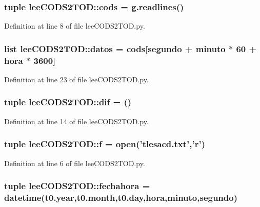\subsubsection[{cods}]{\setlength{\rightskip}{0pt plus 5cm}tuple {\bf lee\-C\-O\-D\-S2\-T\-O\-D\-::cods} = g.\-readlines()}\label{namespacelee_c_o_d_s2_t_o_d_a1091d58ce26082e7b7c4e94c12fd4dcb}


\-Definition at line 8 of file lee\-C\-O\-D\-S2\-T\-O\-D.\-py.

\subsubsection[{datos}]{\setlength{\rightskip}{0pt plus 5cm}list {\bf lee\-C\-O\-D\-S2\-T\-O\-D\-::datos} = {\bf cods}[segundo + minuto $\ast$ 60 + hora $\ast$ 3600]}\label{namespacelee_c_o_d_s2_t_o_d_a75950e762348f5e054dc20db515efd08}


\-Definition at line 23 of file lee\-C\-O\-D\-S2\-T\-O\-D.\-py.

\subsubsection[{dif}]{\setlength{\rightskip}{0pt plus 5cm}tuple {\bf lee\-C\-O\-D\-S2\-T\-O\-D\-::dif} = ()}\label{namespacelee_c_o_d_s2_t_o_d_a3003dfb96400176e1801d8044dd46508}


\-Definition at line 14 of file lee\-C\-O\-D\-S2\-T\-O\-D.\-py.

\subsubsection[{f}]{\setlength{\rightskip}{0pt plus 5cm}tuple {\bf lee\-C\-O\-D\-S2\-T\-O\-D\-::f} = open('tlesacd.\-txt','r')}\label{namespacelee_c_o_d_s2_t_o_d_a740e14d90ddcc32bacf32d97dda0bbaa}


\-Definition at line 6 of file lee\-C\-O\-D\-S2\-T\-O\-D.\-py.

\subsubsection[{fechahora}]{\setlength{\rightskip}{0pt plus 5cm}tuple {\bf lee\-C\-O\-D\-S2\-T\-O\-D\-::fechahora} = datetime(t0.\-year,t0.\-month,t0.\-day,hora,minuto,segundo)}\label{namespacelee_c_o_d_s2_t_o_d_aa1cf671423328901493feb4800332d89}


